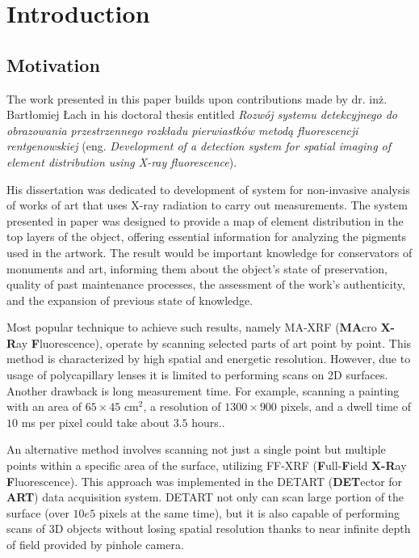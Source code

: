\section{Introduction}
\subsection{Motivation}
The work presented in this paper builds upon contributions made by dr. inż. Bartłomiej Łach in his doctoral thesis entitled \emph{Rozwój systemu detekcyjnego do obrazowania przestrzennego rozkładu pierwiastków metodą fluorescencji rentgenowskiej}\cite{Lach2022}  (eng. \emph{Development of a detection system for spatial imaging of element distribution using X-ray fluorescence}).

His dissertation was dedicated to development of system for non-invasive analysis of works of art that uses X-ray radiation to carry out measurements. 
The system presented in paper was designed to provide a map of element distribution in the top layers of the object, offering essential information for analyzing the pigments used in the artwork. 
The result would be important knowledge for conservators of monuments and art, informing them about the object's state of preservation, quality of past maintenance processes, the assessment of the work's authenticity, and the expansion of previous state of knowledge.

Most popular technique to achieve such results, namely MA-XRF (\textbf{MA}cro \textbf{X-R}ay \textbf{F}luorescence), operate by scanning selected parts of art point by point. 
This method is characterized by high spatial and energetic resolution. 
However, due to usage of polycapillary lenses it is limited to performing scans on 2D surfaces. 
Another drawback is long measurement time. 
For example, scanning a painting with an area of $65 \times 45$ $\text{cm}^{2}$, a resolution of $1300 \times 900$ pixels, and a  dwell time of $10$ ms per pixel could take about $3.5$ hours.\cite{Alfeld2013}. 

An alternative method involves scanning not just a single point but multiple points within a specific area of the surface, utilizing FF-XRF (\textbf{F}ull-\textbf{F}ield \textbf{X-R}ay \textbf{F}luorescence). 
This approach was implemented in the DETART (\textbf{DET}ector for \textbf{ART}) data acquisition system. 
DETART not only can scan large portion of the surface (over $10e5$ pixels at the same time), but it is also capable of performing scans of 3D objects without losing spatial resolution thanks to near infinite depth of field provided by pinhole camera. 

